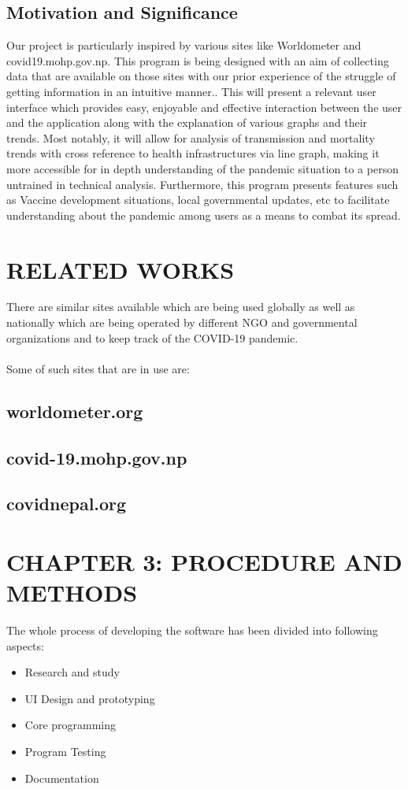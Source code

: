 \documentclass{article}
\begin{document}
\vspace*{5mm}
\subsection{Motivation and Significance}
Our project is particularly inspired by various sites like Worldometer and covid19.mohp.gov.np. This program is being designed with an aim of collecting data that 
are available on those sites with our prior experience of the struggle of getting information in an intuitive manner.. This will present a relevant user interface 
which provides easy, enjoyable and effective interaction between the user and the application along with the explanation of various graphs and their trends. Most 
notably, it will allow for analysis of transmission and mortality trends with cross reference to health infrastructures via line graph, making it more accessible 
for in depth understanding of the pandemic situation to a person untrained in technical analysis. Furthermore, this program presents features such as Vaccine 
development situations, local governmental updates, etc to facilitate understanding about the pandemic among users as a means to combat its spread.

\clearpage

\section{RELATED WORKS}
There are similar sites available which are being used globally as well as nationally which are being operated by different NGO and governmental organizations and 
to keep track of the COVID-19 pandemic.
\\\\
Some of such sites that are in use are:

\subsection{worldometer.org}
\subsection{covid-19.mohp.gov.np}
\subsection{covidnepal.org}

\clearpage

\section{CHAPTER 3: PROCEDURE AND METHODS}
The whole process of developing the software has been divided into following aspects:
\begin{itemize}
    \item Research and study
    \item UI Design and prototyping
    \item Core programming
    \item Program Testing
    \item Documentation
\end{itemize}
\end{document}
